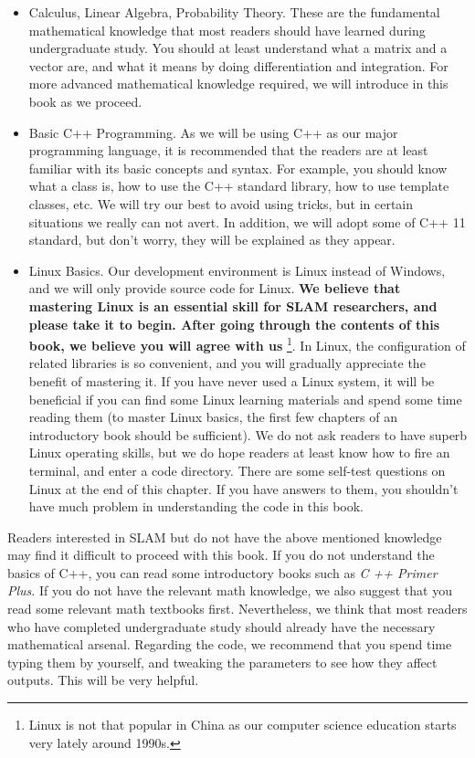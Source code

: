 \begin{itemize}
	\item Calculus, Linear Algebra, Probability Theory. These are the fundamental mathematical knowledge that most readers should have learned during undergraduate study. You should at least understand what a matrix and a vector are, and what it means by doing differentiation and integration. For more advanced mathematical knowledge required, we will introduce in this book as we proceed.
	\item Basic C++ Programming. As we will be using C++ as our major programming language, it is recommended that the readers are at least familiar with its basic concepts and syntax. For example, you should know what a class is, how to use the C++ standard library, how to use template classes, etc. We will try our best to avoid using tricks, but in certain situations we really can not avert. In addition, we will adopt some of C++ 11 standard, but don't worry, they will be explained as they appear.
	
	\item Linux Basics. Our development environment is Linux instead of Windows, and we will only provide source code for Linux. \textbf{We believe that mastering Linux is an essential skill for SLAM researchers, and please take it to begin. After going through the contents of this book, we believe you will agree with us} \footnote{Linux is not that popular in China as our computer science education starts very lately around 1990s.}. In Linux, the configuration of related libraries is so convenient, and you will gradually appreciate the benefit of mastering it. If you have never used a Linux system, it will be beneficial if you can find some Linux learning materials and spend some time reading them (to master Linux basics, the first few chapters of an introductory book should be sufficient). We do not ask readers to have superb Linux operating skills, but we do hope readers at least know how to fire an terminal, and enter a code directory. There are some self-test questions on Linux at the end of this chapter. If you have answers to them, you shouldn't have much problem in understanding the code in this book.
\end{itemize}


Readers interested in SLAM but do not have the above mentioned knowledge may find it difficult to proceed with this book. If you do not understand the basics of C++, you can read some introductory books such as \textit{C ++ Primer Plus}. If you do not have the relevant math knowledge, we also suggest that you read some relevant math textbooks first. Nevertheless, we think that most readers who have completed undergraduate study should already have the necessary mathematical arsenal. Regarding the code, we recommend that you spend time typing them by yourself, and tweaking the parameters to see how they affect outputs. This will be very helpful.

